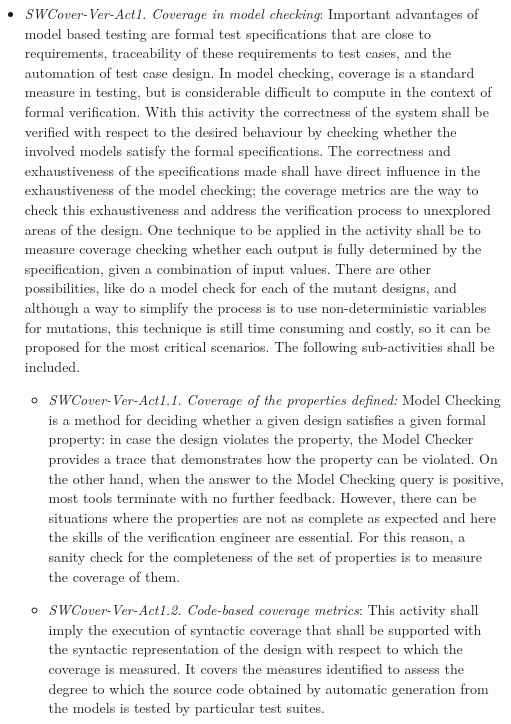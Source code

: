\documentclass{template/openetcs_report}
\begin{document}
\begin{itemize}
\item {\it SWCover-Ver-Act1. Coverage in model checking}: 
Important advantages of model based testing are formal test specifications that are close to requirements, traceability of these requirements to test cases, and the automation of test case design. In model checking, coverage is a standard measure in testing, but is considerable difficult to compute in the context of formal verification. With this activity the correctness of the system shall be verified with respect to the desired behaviour by checking whether the involved models satisfy the formal specifications. The correctness and exhaustiveness of the specifications made shall have direct influence in the exhaustiveness of the model checking; the coverage metrics are the way to check this exhaustiveness and address the verification process to unexplored areas of the design. One technique to be applied in the activity shall be to measure coverage checking whether each output is fully determined by the specification, given a combination of input values. There are other possibilities, like do a model check for each of the mutant designs, and although a way to simplify the process is to use non-deterministic variables for mutations, this technique is still time consuming and costly, so it can be proposed for the most critical scenarios. 
The following sub-activities shall be included.
\begin{itemize}
\item {\it SWCover-Ver-Act1.1. Coverage of the properties defined:} Model Checking is a method for deciding whether a given design satisfies a given formal property: in case the design violates the property, the Model Checker provides a trace that demonstrates how the property can be violated. On the other hand, when the answer to the Model Checking query is positive, most tools terminate with no further feedback. However, there can be situations where the properties are not as complete as expected and here the skills of the verification engineer are essential. For this reason, a sanity check for the completeness of the set of properties is to measure the coverage of them. 
\item {\it SWCover-Ver-Act1.2. Code-based coverage metrics}: This activity shall imply the execution of syntactic coverage that shall be supported with the syntactic representation of the design with respect to which the coverage is measured. It covers the measures identified to assess the degree to which the source code obtained by automatic generation from the models is tested by particular test suites. \\

\end{itemize}
\end{itemize}
\end{document}
